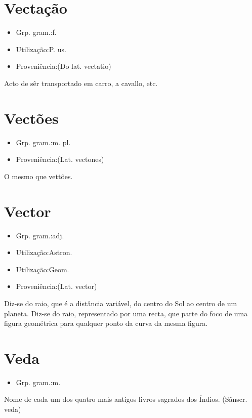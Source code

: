 \documentclass{article}
\begin{document}
\section{Vectação}
\begin{itemize}
\item {Grp. gram.:f.}
\end{itemize}
\begin{itemize}
\item {Utilização:P. us.}
\end{itemize}
\begin{itemize}
\item {Proveniência:(Do lat. \textunderscore vectatio\textunderscore )}
\end{itemize}
Acto de sêr transportado em carro, a cavallo, etc.
\section{Vectões}
\begin{itemize}
\item {Grp. gram.:m. pl.}
\end{itemize}
\begin{itemize}
\item {Proveniência:(Lat. \textunderscore vectones\textunderscore )}
\end{itemize}
O mesmo que \textunderscore vettões\textunderscore .
\section{Vector}
\begin{itemize}
\item {Grp. gram.:adj.}
\end{itemize}
\begin{itemize}
\item {Utilização:Astron.}
\end{itemize}
\begin{itemize}
\item {Utilização:Geom.}
\end{itemize}
\begin{itemize}
\item {Proveniência:(Lat. \textunderscore vector\textunderscore )}
\end{itemize}
Diz-se do raio, que é a distância variável, do centro do Sol ao centro de um planeta.
Diz-se do raio, representado por uma recta, que parte do foco de uma figura geométrica para qualquer ponto da curva da mesma figura.
\section{Veda}
\begin{itemize}
\item {Grp. gram.:m.}
\end{itemize}
Nome de cada um dos quatro mais antigos livros sagrados dos Índios.
(Sânscr. \textunderscore veda\textunderscore )
\end{document}
